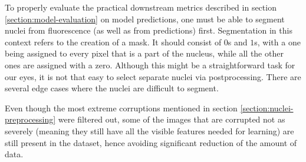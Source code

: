 
To properly evaluate the practical downstream metrics described in section \ref{section:model-evaluation} on model predictions, one must be able to segment nuclei from fluorescence (as well as from predictions) first. Segmentation in this context refers to the creation of a mask. It should consist of $0$s and $1$s,  with a one being assigned to every pixel that is a part of the nucleus, while all the other ones are assigned with a zero. Although this might be a straightforward task for our eyes, it is not that easy to select separate nuclei via postprocessing. There are several edge cases where the nuclei are difficult to segment.

Even though the most extreme corruptions mentioned in section \ref{section:nuclei-preprocessing} were filtered out, some of the images that are corrupted not as severely (meaning they still have all the visible features needed for learning) are still present in the dataset, hence avoiding significant reduction of the amount of data.
